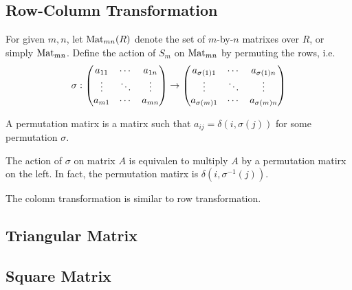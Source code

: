 \subsection{Row-Column Transformation}
For given $m, n$, let ${\mathop{\mathrm{Mat}}}_{mn}(R)$ denote the set of $m$-by-$n$ matrixes over $R$,
or simply ${\mathop{\mathrm{Mat}}}_{mn}$. Define the action of $S_m$ on ${\mathop{\mathrm{Mat}}}_{mn}$ by permuting
the rows, i.e.
\begin{equation*}
\sigma :
\left(\begin{matrix}
a_{11} & \cdots & a_{1n} \cr
\vdots & \ddots & \vdots \cr
a_{m1} & \cdots & a_{mn}
\end{matrix}\right)
\to
\left(\begin{matrix}
a_{\sigma(1) 1} & \cdots & a_{\sigma(1) n} \cr
\vdots & \ddots & \vdots \cr
a_{\sigma(m) 1} & \cdots & a_{\sigma(m) n}
\end{matrix}\right)
\end{equation*}

A permutation matirx is a matirx such that $a_{ij} = \delta(i, \sigma(j))$ for
some permutation $\sigma$.
\begin{pro}
The action of $\sigma$ on matrix $A$ is equivalen to multiply $A$ by a permutation
matirx on the left. In fact, the permutation matirx is $\delta(i, \sigma^{-1}(j))$.
\end{pro}

The colomn transformation is similar to row transformation.

\subsection{Triangular Matrix}

\subsection{Square Matrix}
